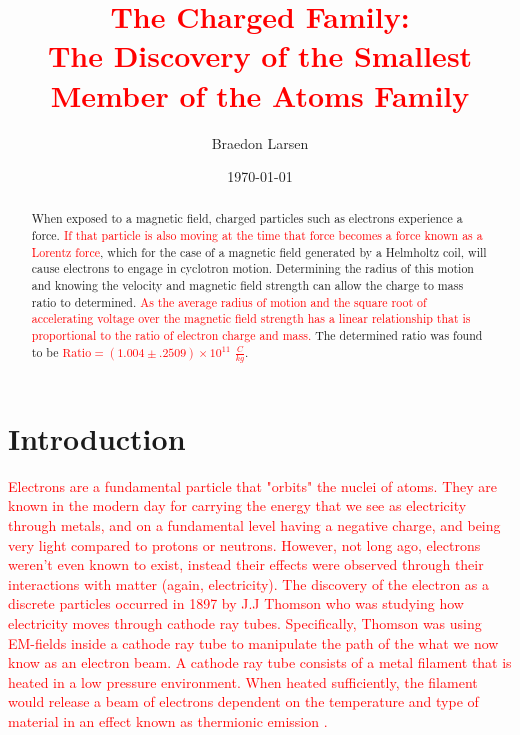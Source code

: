 \documentclass[%
 reprint,
 amsmath,amssymb,
 aps,
]{revtex4-2}
\begin{document}

\title{\textcolor{red}{The Charged Family:}\\\textcolor{red}{The Discovery of the Smallest Member of the Atoms Family}}

\author{Braedon Larsen}

\date{\today}

\begin{abstract}
When exposed to a magnetic field, charged particles such as electrons experience a force. \textcolor{red}{If that particle is also moving at the time that force becomes a force known as a Lorentz force}, which for the case of a magnetic field generated by a Helmholtz coil, will cause electrons to engage in cyclotron motion. Determining the radius of this motion and knowing the velocity and magnetic field strength can allow the charge to mass ratio to determined. \textcolor{red}{As the average radius of motion and the square root of accelerating voltage over the magnetic field strength has a linear relationship that is proportional to the ratio of electron charge and mass.} The determined ratio was found to be \textcolor{red}{$\text{Ratio} = ( 1.004 \pm .2509 )\times 10^{11}$ $\frac{C}{kg}$}.
\end{abstract}

\maketitle

\section{Introduction}

\textcolor{red}{Electrons are a fundamental particle that "orbits" the nuclei of atoms. They are known in the modern day for carrying the energy that we see as electricity through metals, and on a  fundamental level having a negative charge, and being very light compared to protons or neutrons. However, not long ago, electrons weren't even known to exist, instead their effects were observed through their interactions with matter (again, electricity). The discovery of the electron as a discrete particles occurred in 1897 by J.J Thomson who was studying how electricity moves through cathode ray tubes\cite{Chodos_2000}. Specifically, Thomson was using EM-fields inside a cathode ray tube to manipulate the path of the what we now know as an electron beam. A cathode ray tube consists of a metal filament that is heated in a low pressure environment. When heated sufficiently, the filament would release a beam of electrons dependent on the temperature and type of material in an effect known as thermionic emission \cite{goel2026thermionic}.}
\end{document}
